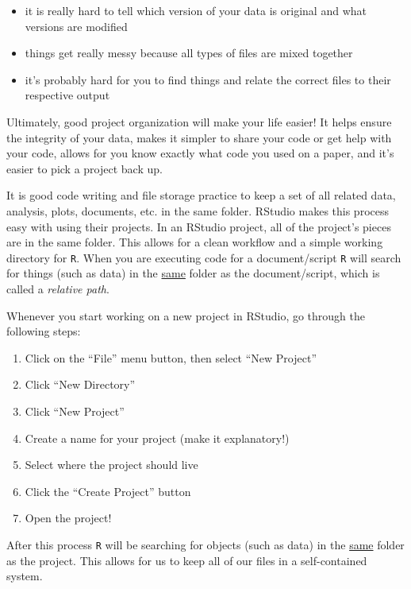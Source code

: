 \documentclass[
  10pt,
  letterpaper,
  twoside,
  openright]{book}
\providecommand{\tightlist}{%
  \setlength{\itemsep}{0pt}\setlength{\parskip}{0pt}}
\begin{document}
\begin{itemize}
\tightlist
\item
  it is really hard to tell which version of your data is original and
  what versions are modified\\
\item
  things get really messy because all types of files are mixed
  together\\
\item
  it's probably hard for you to find things and relate the correct files
  to their respective output
\end{itemize}

Ultimately, good project organization will make your life easier! It
helps ensure the integrity of your data, makes it simpler to share your
code or get help with your code, allows for you know exactly what code
you used on a paper, and it's easier to pick a project back up.

It is good code writing and file storage practice to keep a set of all
related data, analysis, plots, documents, etc. in the same folder.
RStudio makes this process easy with using their projects. In an RStudio
project, all of the project's pieces are in the same folder. This allows
for a clean workflow and a simple working directory for \texttt{R}. When
you are executing code for a document/script \texttt{R} will search for
things (such as data) in the \underline{same} folder as the
document/script, which is called a \emph{relative path}.

Whenever you start working on a new project in RStudio, go through the
following steps:

\begin{enumerate}
\def\labelenumi{\arabic{enumi}.}
\tightlist
\item
  Click on the ``File'' menu button, then select ``New Project''
\item
  Click ``New Directory''
\item
  Click ``New Project''
\item
  Create a name for your project (make it explanatory!)
\item
  Select where the project should live
\item
  Click the ``Create Project'' button
\item
  Open the project!
\end{enumerate}

After this process \texttt{R} will be searching for objects (such as
data) in the \underline{same} folder as the project. This allows for us
to keep all of our files in a self-contained system.
\end{document}
